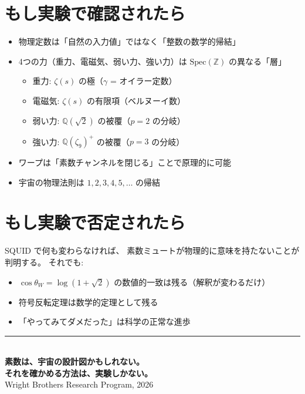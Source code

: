\documentclass[12pt,a4paper]{article}
\begin{document}
\section{もし実験で確認されたら}

\begin{storybox}[もし本当なら]
\begin{itemize}
\item 物理定数は「自然の入力値」ではなく「整数の数学的帰結」
\item 4つの力（重力、電磁気、弱い力、強い力）は
  $\mathrm{Spec}(\mathbb{Z})$ の異なる「層」
  \begin{itemize}
  \item 重力: $\zeta(s)$ の極（$\gamma$ = オイラー定数）
  \item 電磁気: $\zeta(s)$ の有限項（ベルヌーイ数）
  \item 弱い力: $\mathbb{Q}(\sqrt{2})$ の被覆（$p=2$ の分岐）
  \item 強い力: $\mathbb{Q}(\zeta_9)^+$ の被覆（$p=3$ の分岐）
  \end{itemize}
\item ワープは「素数チャンネルを閉じる」ことで原理的に可能
\item 宇宙の物理法則は $1, 2, 3, 4, 5, \ldots$ の帰結
\end{itemize}
\end{storybox}

\section{もし実験で否定されたら}

SQUID で何も変わらなければ、
素数ミュートが物理的に意味を持たないことが判明する。
それでも:
\begin{itemize}
\item $\cos\theta_W = \log(1+\sqrt{2})$ の数値的一致は残る（解釈が変わるだけ）
\item 符号反転定理は数学的定理として残る
\item 「やってみてダメだった」は科学の正常な進歩
\end{itemize}

\vfill

\begin{center}
\rule{8cm}{0.4pt}\\[0.5cm]
{\large\textbf{素数は、宇宙の設計図かもしれない。}}\\[0.1cm]
{\large\textbf{それを確かめる方法は、実験しかない。}}\\[0.3cm]
{\small Wright Brothers Research Program, 2026}
\end{center}
\end{document}
